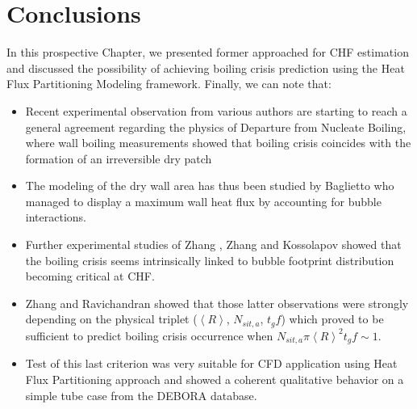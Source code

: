 \section{Conclusions}

In this prospective Chapter, we presented former approached for CHF estimation and discussed the possibility of achieving boiling crisis prediction using the Heat Flux Partitioning Modeling framework. Finally, we can note that:

\begin{itemize}
\item Recent experimental observation from various authors are starting to reach a general agreement regarding the physics of Departure from Nucleate Boiling, where wall boiling measurements showed that boiling crisis coincides with the formation of an irreversible dry patch

\item The modeling of the dry wall area has thus been studied by Baglietto \etal \cite{baglietto_boiling_2019} who managed to display a maximum wall heat flux by accounting for bubble interactions.

\item Further experimental studies of Zhang \etal \cite{zhang_percolative_2019}, Zhang \cite{zhang_new_2022} and Kossolapov \cite{kossolapov_experimental_2021} showed that the boiling crisis seems intrinsically linked to bubble footprint distribution becoming critical at CHF.  

\item Zhang \cite{zhang_new_2022} and Ravichandran \etal \cite{ravichandran_infrared_2022} showed that those latter observations were strongly depending on the physical triplet ($\left<R\right>$, $N_{sit,a}$, $t_{g}f$) which proved to be sufficient to predict boiling crisis occurrence when $N_{sit,a} \pi \left<R\right>^{2} t_{g}f \sim 1$.

\item Test of this last criterion was very suitable for CFD application using Heat Flux Partitioning approach and showed a coherent qualitative behavior on a simple tube case from the DEBORA database.
\end{itemize}
